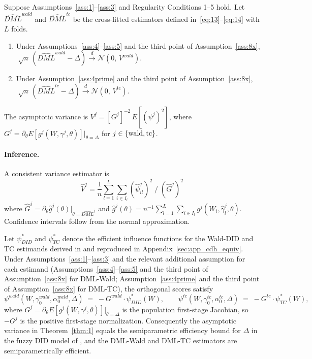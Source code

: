 \begin{theorem}\label{thm:1}
Suppose Assumptions~\ref{ass:1}--\ref{ass:3} and Regularity Conditions 1--5 hold. Let $\widehat{DML}^{wald}$ and $\widehat{DML}^{tc}$ be the cross-fitted estimators defined in~\eqref{eq:13}--\eqref{eq:14} with $L$ folds.
\begin{enumerate}
    \item[\textup{(i)}] Under Assumptions~\ref{ass:4}--\ref{ass:5} and the third point of Assumption~\ref{ass:8x},
    $\;\sqrt{n}\,(\widehat{DML}^{wald}-\Delta) \xrightarrow{d} \mathcal{N}(0,\, V^{wald})$.
    \item[\textup{(ii)}] Under Assumption~\ref{ass:4prime} and the third point of Assumption~\ref{ass:8x},
    $\;\sqrt{n}\,(\widehat{DML}^{tc}-\Delta) \xrightarrow{d} \mathcal{N}(0,\, V^{tc})$.
\end{enumerate}
The asymptotic variance is $V^{j}=[G^{j}]^{-2}\,E[(\psi^{j})^2]$, where $G^{j}=\partial_\theta E[g^j(W, \gamma^j,\theta)]\big|_{\theta=\Delta}$ for $j\in\{\textup{wald}, \textup{tc}\}$.
\end{theorem}

\paragraph{Inference.} A consistent variance estimator is
\begin{equation*}
    \hat{V}^j = \frac{1}{n}\sum_{l=1}^{L} \sum_{i\in I_l} (\hat{\psi}_{il}^{j})^2 \;\Big/\; \left(\hat{G}^j\right)^2
\end{equation*}
where $\hat{G}^j = \partial_\theta \hat{g}^j(\theta)\big|_{\theta = \widehat{DML}^j}$ and $\hat{g}^j(\theta) = n^{-1}\sum_{l=1}^{L} \sum_{i\in I_l}g^j(W_i, \hat{\gamma}^j_l, \theta)$. Confidence intervals follow from the normal approximation.

\begin{proposition}\label{prop:4}
Let $\psi^{*}_{DID}$ and $\psi^{*}_{TC}$ denote the efficient influence functions for the Wald-DID and TC estimands derived in \citet[Supplementary Data, p.~45]{fuzzy2018} and reproduced in Appendix~\ref{sec:app_cdh_equiv}. Under Assumptions~\ref{ass:1}--\ref{ass:3} and the relevant additional assumption for each estimand (Assumptions~\ref{ass:4}--\ref{ass:5} and the third point of Assumption~\ref{ass:8x} for DML-Wald; Assumption~\ref{ass:4prime} and the third point of Assumption~\ref{ass:8x} for DML-TC), the orthogonal scores satisfy
\[
    \psi^{wald}(W,\gamma^{wald}_0,\alpha^{wald}_0,\Delta) \;=\; -G^{wald}\cdot\psi^{*}_{DID}(W), \qquad
    \psi^{tc}(W,\gamma^{tc}_0,\alpha^{tc}_0,\Delta) \;=\; -G^{tc}\cdot\psi^{*}_{TC}(W),
\]
where $G^{j}=\partial_\theta E[g^j(W,\gamma^j,\theta)]\big|_{\theta=\Delta}$ is the population first-stage Jacobian, so $-G^j$ is the positive first-stage normalization. Consequently the asymptotic variance in Theorem~\ref{thm:1} equals the semiparametric efficiency bound for $\Delta$ in the fuzzy DID model of \citet{fuzzy2018}, and the DML-Wald and DML-TC estimators are semiparametrically efficient.
\end{proposition}

